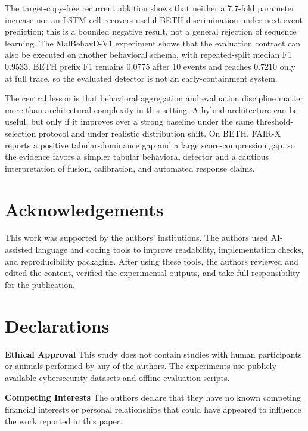\documentclass[10pt,journal,compsoc]{IEEEtran}
\begin{document}
The target-copy-free recurrent ablation shows that neither a 7.7-fold parameter increase nor an LSTM cell recovers useful BETH discrimination under next-event prediction; this is a bounded negative result, not a general rejection of sequence learning. The MalBehavD-V1 experiment shows that the evaluation contract can also be executed on another behavioral schema, with repeated-split median F1 0.9533. BETH prefix F1 remains 0.0775 after 10 events and reaches 0.7210 only at full trace, so the evaluated detector is not an early-containment system.

The central lesson is that behavioral aggregation and evaluation discipline matter more than architectural complexity in this setting. A hybrid architecture can be useful, but only if it improves over a strong baseline under the same threshold-selection protocol and under realistic distribution shift. On BETH, FAIR-X reports a positive tabular-dominance gap and a large score-compression gap, so the evidence favors a simpler tabular behavioral detector and a cautious interpretation of fusion, calibration, and automated response claims.

\section*{Acknowledgements}
This work was supported by the authors' institutions. The authors used AI-assisted language and coding tools to improve readability, implementation checks, and reproducibility packaging. After using these tools, the authors reviewed and edited the content, verified the experimental outputs, and take full responsibility for the publication.

\section*{Declarations}
\begin{sloppypar}
\noindent\textbf{Ethical Approval} This study does not contain studies with human participants or animals performed by any of the authors. The experiments use publicly available cybersecurity datasets and offline evaluation scripts.
\end{sloppypar}

\noindent
\begin{sloppypar}
\textbf{Competing Interests} The authors declare that they have no known competing financial interests or personal relationships that could have appeared to influence the work reported in this paper.
\end{sloppypar}
\end{document}
